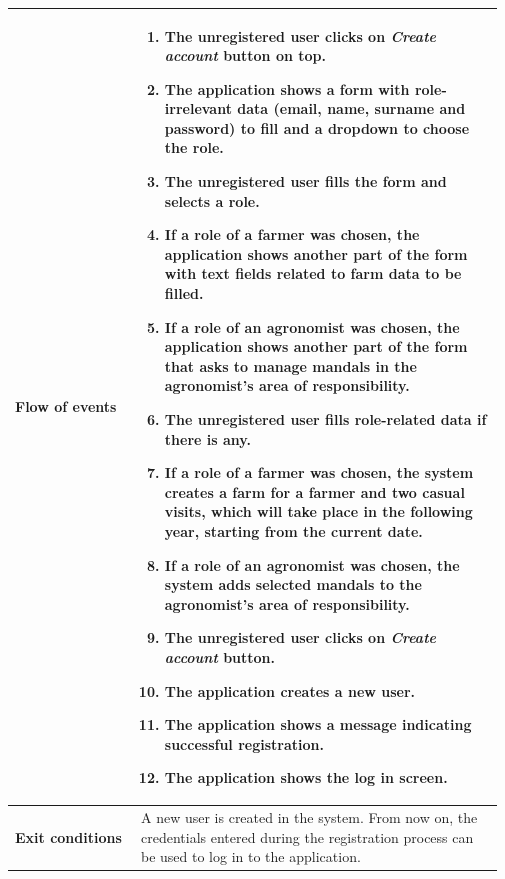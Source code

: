 \begin{longtable}{@{}p{0.25\linewidth} p{0.72\linewidth}@{}}
	\textbf{Flow of events}     & \begin{enumerate}[leftmargin=.4cm,noitemsep,topsep=0pt,before=\vspace{-3mm},after=\vspace{-4mm}]
	    \item The unregistered user clicks on \textit{Create account} button on top.
	    \item The application shows a form with role-irrelevant data (email, name, surname and password) to fill and a dropdown to choose the role.
	    \item The unregistered user fills the form and selects a role.
	    \item If a role of a farmer was chosen, the application shows another part of the form with text fields related to farm data to be filled.
	    \item If a role of an agronomist was chosen, the application shows another part of the form that asks to manage mandals in the agronomist's area of responsibility.
	    \item The unregistered user fills role-related data if there is any.
	    \item If a role of a farmer was chosen, the system creates a farm for a farmer and two casual visits, which will take place in the following year, starting from the current date.
	    \item If a role of an agronomist was chosen, the system adds selected mandals to the agronomist's area of responsibility.
	    \item The unregistered user clicks on \textit{Create account} button.
	    \item The application creates a new user.
	    \item The application shows a message indicating successful registration.
	    \item The application shows the log in screen.
	\end{enumerate}\\
	\midrule
	\textbf{Exit conditions}    & A new user is created in the system. From now on, the credentials entered during the registration process can be used to log in to the application. \\
	\midrule
	

\end{longtable}
